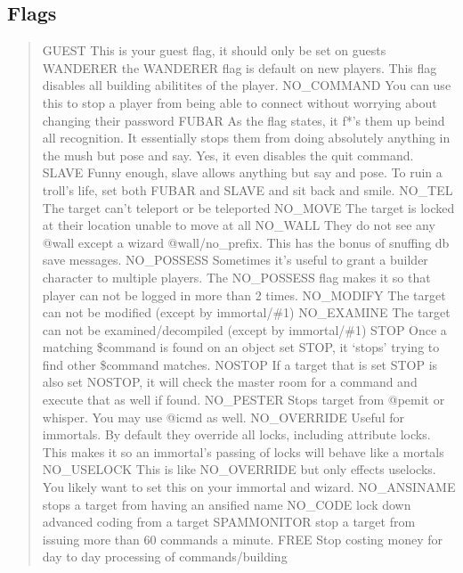 \documentclass[letterpaper,10pt,english]{sphinxmanual}
\begin{document}
\subsection{Flags}
\label{\detokenize{security:flags}}\begin{quote}

\sphinxAtStartPar
GUEST    \sphinxhyphen{} This is your guest flag, it should only be set on guests
WANDERER \sphinxhyphen{} the WANDERER flag is default on new players.  This flag disables all building abilitites of the player.
NO\_COMMAND \sphinxhyphen{} You can use this to stop a player from being able to connect without worrying about changing their password
FUBAR      \sphinxhyphen{} As the flag states, it f*’s them up beind all recognition.  It essentially stops them from doing absolutely anything in the mush but pose and say.  Yes, it even disables the quit command.
SLAVE      \sphinxhyphen{} Funny enough, slave allows anything but say and pose.  To ruin a troll’s life, set both FUBAR and SLAVE and sit back and smile.
NO\_TEL     \sphinxhyphen{} The target can’t teleport or be teleported
NO\_MOVE    \sphinxhyphen{} The target is locked at their location unable to move at all
NO\_WALL    \sphinxhyphen{} They do not see any @wall except a wizard @wall/no\_prefix.  This has the bonus of snuffing db save messages.
NO\_POSSESS \sphinxhyphen{} Sometimes it’s useful to grant a builder character to multiple players.  The NO\_POSSESS flag makes it so that player can not be logged in more than 2 times.
NO\_MODIFY  \sphinxhyphen{} The target can not be modified (except by immortal/\#1)
NO\_EXAMINE \sphinxhyphen{} The target can not be examined/decompiled (except by immortal/\#1)
STOP       \sphinxhyphen{} Once a matching \$command is found on an object set STOP, it ‘stops’ trying to find other \$command matches.
NOSTOP     \sphinxhyphen{} If a target that is set STOP is also set NOSTOP, it will check the master room for a command and execute that as well if found.
NO\_PESTER  \sphinxhyphen{} Stops target from @pemit or whisper.  You may use @icmd as well.
NO\_OVERRIDE \sphinxhyphen{} Useful for immortals.  By default they override all locks, including attribute locks.  This makes it so an immortal’s passing of locks will behave like a mortals NO\_USELOCK  \sphinxhyphen{} This is like NO\_OVERRIDE but only effects uselocks.  You likely want to set this on your immortal and wizard.
NO\_ANSINAME \sphinxhyphen{} stops a target from having an ansified name
NO\_CODE     \sphinxhyphen{} lock down advanced coding from a target
SPAMMONITOR \sphinxhyphen{} stop a target from issuing more than 60 commands a minute.
FREE        \sphinxhyphen{} Stop costing money for day to day processing of commands/building
\end{quote}
\end{document}
